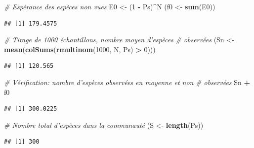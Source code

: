 \documentclass[
  11pt,
  french,
  a4paper,
  extrafontsizes,onecolumn,openright
  ]{memoir}
\newenvironment{Shaded}{\begin{snugshade}}{\end{snugshade}}
\newcommand{\CommentTok}[1]{\textcolor[rgb]{0.56,0.35,0.01}{\textit{#1}}}
\newcommand{\DecValTok}[1]{\textcolor[rgb]{0.00,0.00,0.81}{#1}}
\newcommand{\KeywordTok}[1]{\textcolor[rgb]{0.13,0.29,0.53}{\textbf{#1}}}
\newcommand{\NormalTok}[1]{#1}
\newcommand{\OperatorTok}[1]{\textcolor[rgb]{0.81,0.36,0.00}{\textbf{#1}}}
\newcommand{\StringTok}[1]{\textcolor[rgb]{0.31,0.60,0.02}{#1}}
\begin{document}
\scriptsize

\begin{Shaded}
\begin{Highlighting}[]
\CommentTok{# Espérance des espèces non vues}
\NormalTok{E0 <-}\StringTok{ }\NormalTok{(}\DecValTok{1} \OperatorTok{-}\StringTok{ }\NormalTok{Ps)}\OperatorTok{^}\NormalTok{N}
\NormalTok{(f0 <-}\StringTok{ }\KeywordTok{sum}\NormalTok{(E0))}
\end{Highlighting}
\end{Shaded}

\begin{verbatim}
## [1] 179.4575
\end{verbatim}

\begin{Shaded}
\begin{Highlighting}[]
\CommentTok{# Tirage de 1000 échantillons, nombre moyen d'espèces}
\CommentTok{# observées}
\NormalTok{(Sn <-}\StringTok{ }\KeywordTok{mean}\NormalTok{(}\KeywordTok{colSums}\NormalTok{(}\KeywordTok{rmultinom}\NormalTok{(}\DecValTok{1000}\NormalTok{, N, Ps) }\OperatorTok{>}\StringTok{ }\DecValTok{0}\NormalTok{)))}
\end{Highlighting}
\end{Shaded}

\begin{verbatim}
## [1] 120.565
\end{verbatim}

\begin{Shaded}
\begin{Highlighting}[]
\CommentTok{# Vérification: nombre d'espèces observées en moyenne et non}
\CommentTok{# observées}
\NormalTok{Sn }\OperatorTok{+}\StringTok{ }\NormalTok{f0}
\end{Highlighting}
\end{Shaded}

\begin{verbatim}
## [1] 300.0225
\end{verbatim}

\begin{Shaded}
\begin{Highlighting}[]
\CommentTok{# Nombre total d'espèces dans la communauté}
\NormalTok{(S <-}\StringTok{ }\KeywordTok{length}\NormalTok{(Ps))}
\end{Highlighting}
\end{Shaded}

\begin{verbatim}
## [1] 300
\end{verbatim}
\end{document}
